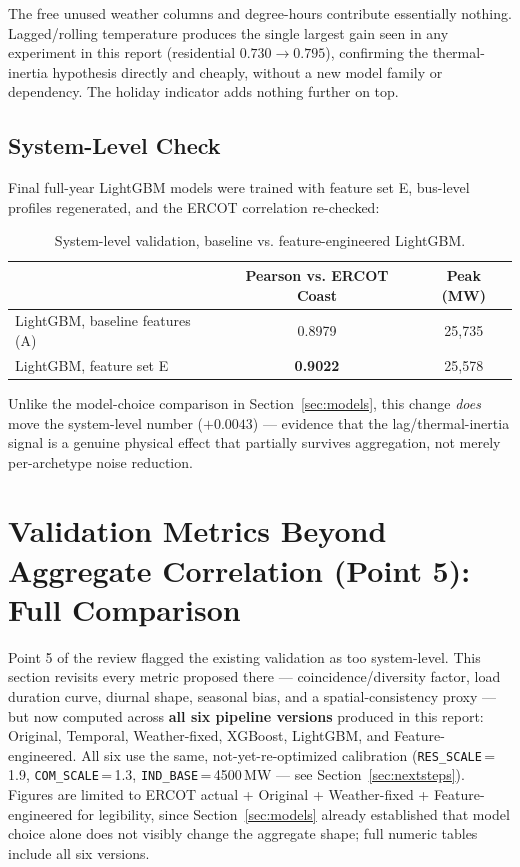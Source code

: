 \documentclass[11pt]{article}
\begin{document}
The free unused weather columns and degree-hours contribute essentially nothing.
Lagged/rolling temperature produces the single largest gain seen in any experiment in
this report (residential $0.730\rightarrow0.795$), confirming the thermal-inertia
hypothesis directly and cheaply, without a new model family or dependency. The
holiday indicator adds nothing further on top.

\subsection{System-Level Check}

Final full-year LightGBM models were trained with feature set E, bus-level profiles
regenerated, and the ERCOT correlation re-checked:

\begin{table}[H]
\centering
\begin{tabular}{lcc}
\toprule
 & Pearson vs. ERCOT Coast & Peak (MW) \\
\midrule
LightGBM, baseline features (A) & 0.8979 & 25{,}735 \\
LightGBM, feature set E & \textbf{0.9022} & 25{,}578 \\
\bottomrule
\end{tabular}
\caption{System-level validation, baseline vs. feature-engineered LightGBM.}
\end{table}

Unlike the model-choice comparison in Section~\ref{sec:models}, this change
\emph{does} move the system-level number ($+0.0043$) --- evidence that the
lag/thermal-inertia signal is a genuine physical effect that partially survives
aggregation, not merely per-archetype noise reduction.

\section{Validation Metrics Beyond Aggregate Correlation (Point 5): Full Comparison}
\label{sec:validation}

Point 5 of the review flagged the existing validation as too system-level. This
section revisits every metric proposed there --- coincidence/diversity factor, load
duration curve, diurnal shape, seasonal bias, and a spatial-consistency proxy --- but
now computed across \textbf{all six pipeline versions} produced in this report:
Original, Temporal, Weather-fixed, XGBoost, LightGBM, and Feature-engineered. All six
use the same, not-yet-re-optimized calibration
(\texttt{RES\_SCALE}\,=\,1.9, \texttt{COM\_SCALE}\,=\,1.3, \texttt{IND\_BASE}\,=\,4500\,MW
--- see Section~\ref{sec:nextsteps}). Figures are limited to ERCOT actual + Original +
Weather-fixed + Feature-engineered for legibility, since Section~\ref{sec:models}
already established that model choice alone does not visibly change the aggregate
shape; full numeric tables include all six versions.
\end{document}

